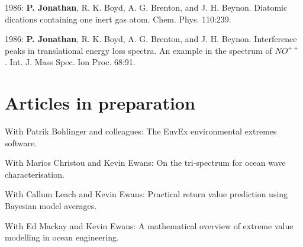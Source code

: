 \documentclass[11pt,a4paper]{moderncv}
\begin{document}
1986: \textbf{P. Jonathan}, R. K. Boyd, A. G. Brenton, and J. H. Beynon. Diatomic dications containing one inert gas atom. Chem. Phys. 110:239.

1986: \textbf{P. Jonathan}, R. K. Boyd, A. G. Brenton, and J. H. Beynon. Interference peaks in translational energy loss spectra. An example in the spectrum of $NO^{++}$ . Int. J. Mass Spec. Ion Proc. 68:91.

\setlength{\parskip}{0em}

\section{Articles in preparation}

\setlength{\parskip}{0.5em}

With Patrik Bohlinger and colleagues: The EnvEx environmental extremes software.

With Marios Christou and Kevin Ewans: On the tri-spectrum for ocean wave characterisation.

With Callum Leach and Kevin Ewans: Practical return value prediction using Bayesian model averages.

With Ed Mackay and Kevin Ewans: A mathematical overview of extreme value modelling in ocean engineering.

\clearpage
\end{document}
